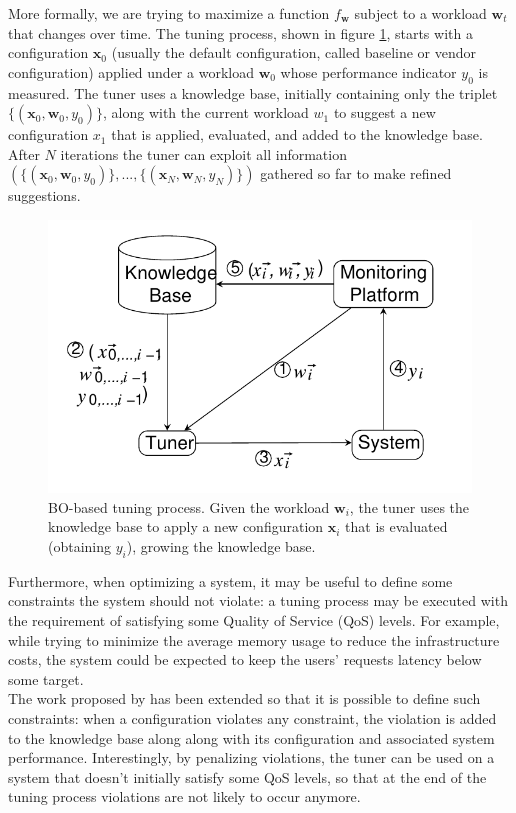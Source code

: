 \documentclass[a4paper, 12pt]{article} %
\begin{document}
	More formally, we are trying to maximize a function $f_{\pmb{w}}$ subject to a workload $\pmb{w}_t$ that changes over time. The tuning process, shown in figure \ref{fig:cgp_it_sys}, starts with a configuration $\pmb{x}_0$ (usually the default configuration, called baseline or vendor configuration) applied under a workload $\pmb{w}_0$ whose performance indicator $y_0$ is measured. The tuner uses a knowledge base, initially containing only the triplet $\{(\pmb{x}_0, \pmb{w}_0, y_0)\}$, along with the current workload $w_1$ to suggest a new configuration $x_1$ that is applied, evaluated, and added to the knowledge base. After $N$ iterations the tuner can exploit all information $(\{(\pmb{x}_0, \pmb{w}_0, y_0)\}, ..., \{(\pmb{x}_N, \pmb{w}_N, y_N)\})$ gathered so far to make refined suggestions.
	\begin{figure} \label{fig:cgp_it_sys}
		\includegraphics[width=\linewidth]{img/cgp_it_sys.png}
		\caption{BO-based tuning process. Given the workload $\pmb{w}_i$, the tuner uses the knowledge base to apply a new configuration $\pmb{x}_i$ that is evaluated (obtaining $y_i$), growing the knowledge base.}
	\end{figure}
	
	Furthermore, when optimizing a system, it may be useful to define some constraints the system should not violate: a tuning process may be executed with the requirement of satisfying some Quality of Service (QoS) levels. For example, while trying to minimize the average memory usage to reduce the infrastructure costs, the system could be expected to keep the users' requests latency below some target.  \\
	The work proposed by \cite{AkamasCGP} has been extended so that it is possible to define such constraints: when a configuration violates any constraint, the violation is added to the knowledge base along along with its configuration and associated system performance. Interestingly, by penalizing violations, the tuner can be used on a system that doesn't initially satisfy some QoS levels, so that at the end of the tuning process violations are not likely to occur anymore.
	
\end{document}
